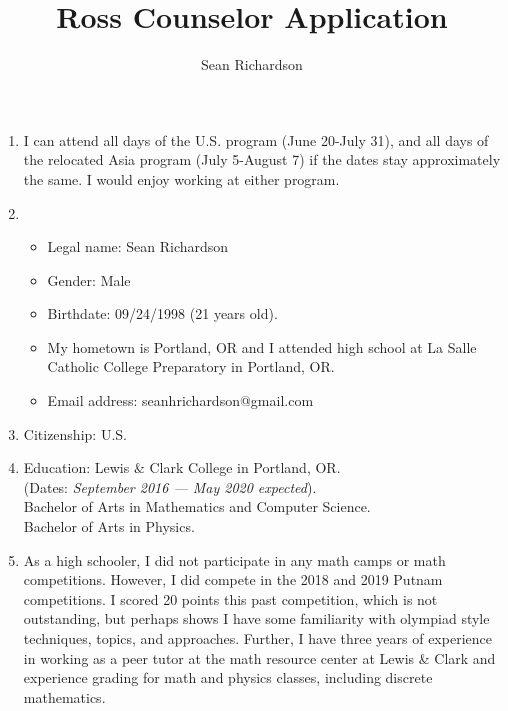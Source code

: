\documentclass[12]{amsart}
\begin{document}
    \title{Ross Counselor Application}
    \author{Sean Richardson}
    \maketitle
    
    \begin{enumerate}
        \item I can attend all days of the U.S. program (June 20-July 31), and all days of the relocated Asia program (July 5-August 7) if the dates stay approximately the same. I would enjoy working at either program.\\
        \item 
            \begin{itemize}
                \item Legal name: Sean Richardson
                \item Gender: Male
                \item Birthdate: 09/24/1998 (21 years old).
                \item My hometown is Portland, OR and I attended high school at La Salle Catholic College Preparatory in Portland, OR.
                \item Email address: seanhrichardson@gmail.com\\
            \end{itemize}
        \item Citizenship: U.S.\\
        \item Education: Lewis \& Clark College in Portland, OR.\\
            (Dates: \textit{September 2016 --- May 2020 expected}).\\
            Bachelor of Arts in Mathematics and Computer Science.\\
            Bachelor of Arts in Physics.\\

        \item As a high schooler, I did not participate in any math camps or
            math competitions. However, I did compete in the 2018 and 2019
            Putnam competitions. I scored 20 points this past competition,
            which is not outstanding, but perhaps shows I have some familiarity with olympiad style techniques, topics, and approaches. Further, I have three
            years of experience in working as a peer tutor at the math resource center at Lewis \& Clark and experience grading for math and physics classes, including discrete mathematics. \\


\end{enumerate}
\end{document}
